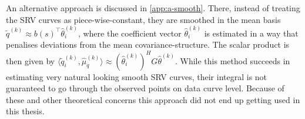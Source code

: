 An alternative approach is discussed in \cref{app:a-smooth}.
There, instead of treating the SRV curves as piece-wise-constant, they are smoothed in the mean basis $\widetilde q^{(k)} \approx b(s)^\top \hat\theta_i^{(k)}$, where the coefficient vector $\hat\theta_i^{(k)}$ is estimated in a way that penalises deviations from the mean covariance-structure.
The scalar product is then given by $\langle \widetilde q_i^{(k)}, \hat\mu_q^{(k)} \rangle \approx (\hat\theta_i^{(k)})^H G \hat\theta^{(k)}$.
While this method succeeds in estimating very natural looking smooth SRV curves, their integral is not guaranteed to go through the observed points on data curve level.
Because of these and other theoretical concerns this approach did not end up getting used in this thesis.
